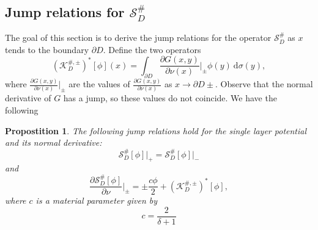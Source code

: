 \documentclass[a4paper]{article}
\newtheorem{prop}{Propostition}
\theoremstyle{definition}
\renewcommand{\S}{\mathcal{S}}
\newcommand{\K}{\mathcal{K}}
\newcommand{\dx}{\: \mathrm{d}}
\begin{document}
\subsection{Jump relations for $\S_D^\#$}
The goal of this section is to derive the jump relations for the operator $\S_D^\#$ as $x$ tends to the boundary $\partial D$. Define the two operators 
\[(\K_D^{\#,\pm})^*[\phi](x) = \int_{\partial D}\frac{\partial G(x,y)}{\partial \nu(x)}\bigg|_{\pm} \phi(y)\dx \sigma(y),\]
where $\frac{\partial G(x,y)}{\partial \nu(x)}\big|_{\pm}$ are the values of $\frac{\partial G(x,y)}{\partial \nu(x)}$ as $x\rightarrow \partial D \pm$. Observe that the normal derivative of $G$ has a jump, so these values do not coincide. We have the following
\begin{prop} \label{prop:jump}
	The following jump relations hold for the single layer potential and its normal derivative:
\[\S_D^\#[\phi]\big|_+ = \S_D^\#[\phi]\big|_-\]
and
\[\frac{\partial \S_D^\#[\phi]}{\partial \nu} \bigg|_{\pm} = \pm \frac{c\phi}{2} + (\K_D^{\#,\pm})^* [\phi],\]
where $c$ is a material parameter given by
\[c = \frac{2}{\delta+1}\]
\end{prop}
\end{document}
